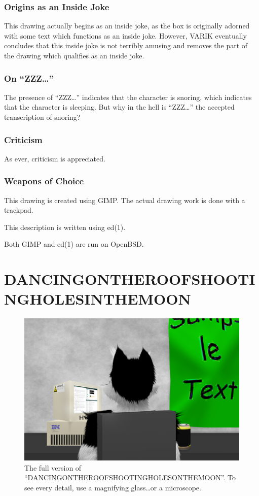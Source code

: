 \documentclass{report}
\begin{document}
\subsection{Origins as an Inside Joke}
This drawing actually begins as an inside joke, as the box is originally adorned with some text which functions as an inside joke.  However, VARIK eventually concludes that this inside joke is not terribly amusing and removes the part of the drawing which qualifies as an inside joke.

\subsection{On ``ZZZ\ldots''}
The presence of ``ZZZ\ldots'' indicates that the character is snoring, which indicates that the character is sleeping.  But why in the hell is ``ZZZ\ldots'' the accepted transcription of snoring?

\subsection{Criticism}
As ever, criticism is appreciated.

\subsection{Weapons of Choice}
This drawing is created using GIMP\@.  The actual drawing work is done with a trackpad.

This description is written using ed(1).

Both GIMP and ed(1) are run on OpenBSD\@.
\chapter{DANCINGONTHEROOFSHOOTINGHOLESINTHEMOON}
\begin{figure}[ht]
	\centering
	\includegraphics[width=\textwidth]{dancingontheroofshootingholesinthemoon/dancingontheroofshootingholesinthemoon.png}
\caption[center]{The full version of ``DANCINGONTHEROOFSHOOTINGHOLESONTHEMOON''.  To see every detail, use a magnifying glass\ldots or a microscope.}
\end{figure}
\end{document}
